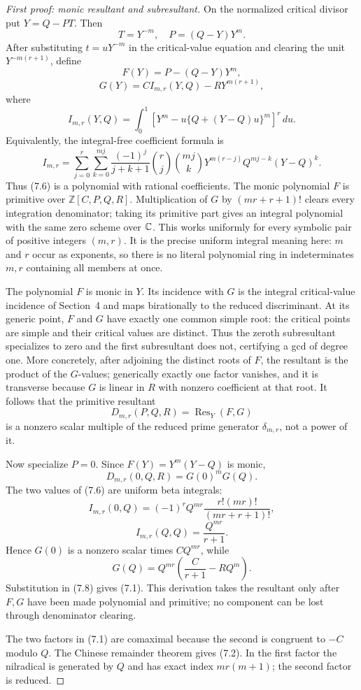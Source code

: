 \begin{proof}[First proof: monic resultant and subresultant]
On the normalized critical divisor put $Y=Q-PT$.  Then
\[
 T=Y^{-m},\quad P=(Q-Y)Y^m.                              \tag{7.3}
\]
After substituting $t=uY^{-m}$ in the critical-value equation and clearing
the unit $Y^{-m(r+1)}$, define
\[
 F(Y)=P-(Q-Y)Y^m,                                        \tag{7.4}
\]
\[
 G(Y)=C I_{m,r}(Y,Q)-RY^{m(r+1)},                        \tag{7.5}
\]
where
\[
I_{m,r}(Y,Q)=
 \int_0^1\left[Y^m-u\{Q+(Y-Q)u\}^m\right]^r\,du.        \tag{7.6}
\]
Equivalently, the integral-free coefficient formula is
\[
 I_{m,r}=
 \sum_{j=0}^r\sum_{k=0}^{mj}
 \frac{(-1)^j}{j+k+1}\binom rj\binom{mj}k
 Y^{m(r-j)}Q^{mj-k}(Y-Q)^k.
\]
Thus (7.6) is a polynomial with rational coefficients.  The monic
polynomial $F$ is primitive over $\mathbb Z[C,P,Q,R]$.  Multiplication of
$G$ by $(mr+r+1)!$ clears every integration denominator; taking its primitive
part gives an integral polynomial with the same zero scheme over $\mathbb C$.  This
works uniformly for every symbolic pair of positive integers $(m,r)$.  It is
the precise uniform integral meaning here: $m$ and $r$ occur as exponents,
so there is no literal polynomial ring in indeterminates $m,r$ containing all
members at once.

The polynomial $F$ is monic in $Y$.  Its incidence with $G$ is the integral
critical-value incidence of Section~4 and maps birationally to the reduced
discriminant.  At its generic point, $F$ and $G$ have exactly one common
simple root: the critical points are simple and their critical values are
distinct.  Thus the zeroth subresultant specializes to zero and the first
subresultant does not, certifying a gcd of degree one.  More concretely,
after adjoining the distinct roots of
$F$, the resultant is the product of the $G$-values; generically exactly one
factor vanishes, and it is transverse because $G$ is linear in $R$ with
nonzero coefficient at that root.  It follows that the primitive resultant
\[
 D_{m,r}(P,Q,R)=\operatorname{Res}_Y(F,G)                 \tag{7.7}
\]
is a nonzero scalar multiple of the reduced prime generator
$\delta_{m,r}$, not a power of it.

Now specialize $P=0$.  Since $F(Y)=Y^m(Y-Q)$ is monic,
\[
 D_{m,r}(0,Q,R)=G(0)^mG(Q).                              \tag{7.8}
\]
The two values of (7.6) are uniform beta integrals:
\[
 I_{m,r}(0,Q)
 =(-1)^rQ^{mr}\frac{r!(mr)!}{(mr+r+1)!},                 \tag{7.9}
\]
\[
 I_{m,r}(Q,Q)=\frac{Q^{mr}}{r+1}.                        \tag{7.10}
\]
Hence $G(0)$ is a nonzero scalar times $CQ^{mr}$, while
\[
 G(Q)=Q^{mr}\left(\frac{C}{r+1}-RQ^m\right).            \tag{7.11}
\]
Substitution in (7.8) gives (7.1).  This derivation takes the resultant only
after $F,G$ have been made polynomial and primitive; no component can be
lost through denominator clearing.

The two factors in (7.1) are comaximal because the second is congruent to
$-C$ modulo $Q$.  The Chinese remainder theorem gives (7.2).  In the first
factor the nilradical is generated by $Q$ and has exact index $mr(m+1)$; the
second factor is reduced.
\end{proof}

